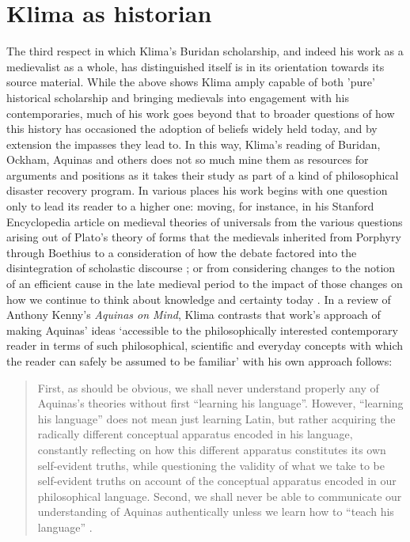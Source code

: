 \documentclass[]{article}
\begin{document}
\section{Klima as historian}
The third respect in which Klima's Buridan scholarship, 
and indeed his work as a medievalist as a whole, 
has distinguished itself 
is in its orientation 
towards its source material. 
While the above shows Klima amply capable of 
both 
'pure' historical scholarship 
and 
bringing medievals into engagement with his contemporaries, 
much of his work goes beyond that to 
broader questions of 
how this history has occasioned
the adoption of beliefs widely held today,
and by extension the impasses they lead to.
In this way, 
Klima's reading of Buridan, 
Ockham, 
Aquinas 
and others 
does not so much mine them as resources for arguments and positions 
as it takes their study as part of a kind of philosophical disaster recovery program. 
In various places 
his work begins with one question only to lead its reader to a higher one: 
moving, 
for instance, 
in his Stanford Encyclopedia article on medieval theories of universals 
from the various questions arising out of Plato's theory of forms 
that the medievals inherited 
from Porphyry 
through Boethius
to a consideration of how the debate factored into the disintegration of scholastic discourse \autocite{sep-universals-medieval}; 
or from considering changes to the notion of an efficient cause in the late medieval period 
to the impact of those changes 
on how we continue to think about knowledge and certainty today \autocite{Klima2013}.
In a review of Anthony Kenny's \emph{Aquinas on Mind}, 
Klima contrasts that work's approach of 
making Aquinas' ideas 
`accessible to the philosophically interested contemporary reader 
in terms of such philosophical, scientific and everyday
concepts with which the reader can safely be assumed to be familiar'\autocite[113]{Klima1998}
with his own approach follows:

\begin{quote}
	First, as should be obvious, we shall never understand properly any of
	Aquinas's theories without first ``learning his language''. However,
	``learning his language'' does not mean just learning Latin, but rather
	acquiring the radically different conceptual apparatus encoded in his
	language, constantly reflecting on how this different apparatus constitutes its own self-evident truths, while questioning the validity of what
	we take to be self-evident truths on account of the conceptual apparatus
	encoded in our philosophical language. 
	Second, we shall never be able to
	communicate our understanding of Aquinas authentically unless we
	learn how to ``teach his language''  \autocite[115]{Klima1998}.
\end{quote} 
\end{document}
